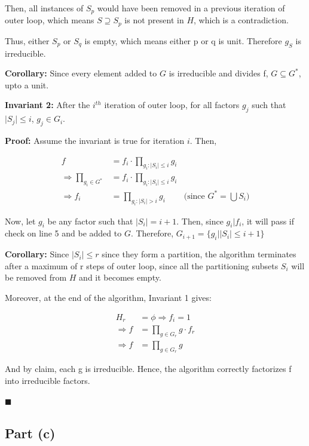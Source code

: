 Then, all instances of $S_p$ would have been removed in a previous iteration of outer loop, which means $S \supseteq S_p$ is not present in $H$, which is a contradiction.

Thus, either $S_p$ or $S_q$ is empty, which means either p or q is unit. Therefore $g_S$ is irreducible.

\textbf{Corollary: } Since every element added to $G$ is irreducible and divides f, $G \subseteq G^*$, upto a unit.

\vspace{2\baselineskip}
\textbf{Invariant 2: } After the $i^{th}$ iteration of outer loop, for all factors $g_j$ such that $\lvert S_j \rvert \le i$, $g_j \in G_i$.

\textbf{Proof: } Assume the invariant is true for iteration $i$. Then, 

\begin{align*}
    f &= f_i \cdot \prod_{g_i: \lvert S_i \rvert \le i} g_i \\
    \Rightarrow \prod_{g_i \in G^*} &= f_i \cdot \prod_{g_i: \lvert S_i \rvert \le i} g_i \\
    \Rightarrow f_i &= \prod_{g_i: \lvert S_i \rvert > i} g_i &\text{(since $G^* = \bigcup S_i$})
\end{align*}

Now, let $g_i$ be any factor such that $\lvert S_i \rvert = i+1$. Then, since $g_i \vert f_i$, it will pass if check on line 5 and be added to $G$. Therefore, $G_{i+1} = \{g_i \vert \lvert S_i \rvert \le i+1\}$

\textbf{Corollary: } Since $\lvert S_i \rvert \le r$ since they form a partition, the algorithm terminates after a maximum of r steps of outer loop, since all the partitioning subsets $S_i$ will be removed from $H$ and it becomes empty.

Moreover, at the end of the algorithm, Invariant 1 gives:

\begin{align*}
    H_r &= \phi \Rightarrow f_i = 1 \\
    \Rightarrow f &= \prod_{g \in G_r} g \cdot f_r \\
    \Rightarrow f &= \prod_{g \in G_r} g
\end{align*}

And by claim, each g is irreducible. Hence, the algorithm correctly factorizes f into irreducible factors.

\hfill $\blacksquare$

\subsection{Part (c)}

